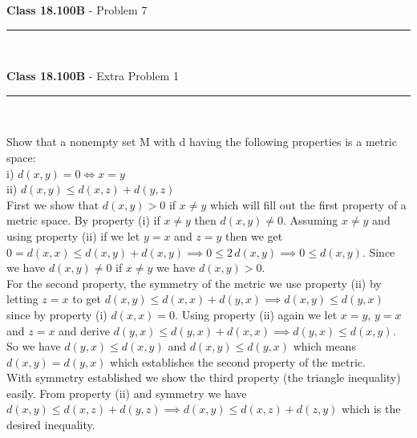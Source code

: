 \documentclass[11pt,reqno]{article}
\begin{document}
\vspace{15pt}
\begin{flushleft} 
\textbf{Class 18.100B} - Problem 7\\
\rule{500pt}{1pt}\\
\end{flushleft} 


\vspace{15pt}
\begin{flushleft} 
\textbf{Class 18.100B} - Extra Problem 1\\
\rule{500pt}{1pt}\\
\end{flushleft} 
Show that a nonempty set M with d having the following properties is a metric space: \\
i) $d(x,y) = 0 \iff x = y$\\
ii) $d(x,y) \le d(x,z) + d(y,z)$ \\ \newline
\indent First we show that $d(x,y) > 0$ if $x \neq y$ which will fill out the first property of a metric space. By property (i) if $x \neq y$ then $d(x,y) \neq 0$. Assuming $x \neq y$ and using property (ii) if we let $y = x$ and $z = y$ then we get $0 = d(x,x) \le d(x,y) + d(x, y) \implies 0 \le 2 \,d(x,y) \implies 0 \le d(x,y)$. Since we have $d(x,y) \neq 0$ if $x \neq y$ we have $d(x,y) > 0$.\\
\indent For the second property, the symmetry of the metric we use property (ii) by letting $z = x$ to get $d(x,y) \le d(x,x) + d(y,x) \implies d(x,y) \le d(y,x)$ since by property (i) $d(x,x) = 0$. Using property (ii) again we let $x = y$, $y = x$ and $z = x$ and derive $d(y,x) \le d(y,x) + d(x,x) \implies d(y,x) \le d(x,y)$. So we have $d(y,x) \le d(x,y)$ and $d(x,y) \le d(y,x)$ which means $d(x,y) = d(y,x)$ which establishes the second property of the metric.\\
\indent With symmetry established we show the third property (the triangle inequality) easily. From property (ii) and symmetry we have $d(x,y) \le d(x,z) + d(y,z) \implies d(x,y) \le d(x,z) + d(z,y)$ which is the desired inequality.
\end{document}
